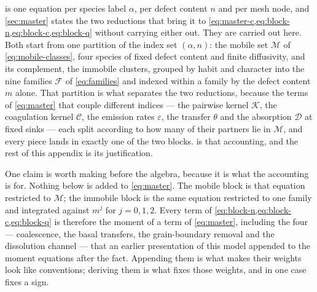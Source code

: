 is one equation per species label $\alpha$, per defect content
$n$ and per mesh node, and \cref{sec:master} states the two reductions that
bring it to \cref{eq:master-c,eq:block-n,eq:block-c,eq:block-q} without
carrying either out. They are carried out here. Both start from one partition of
the index set $(\alpha,n)$: the mobile set $\mathcal M$ of
\cref{eq:mobile-classes}, four species of fixed defect content and finite
diffusivity, and its complement, the immobile clusters, grouped by habit and
character into the nine families $\mathcal F$ of \cref{eq:families} and indexed
within a family by the defect content $m$ alone. That partition is what
separates the two reductions, because the terms of \cref{eq:master} that couple
different indices --- the pairwise kernel $\mathcal K$, the coagulation kernel
$\mathcal C$, the emission rates $\varepsilon$, the transfer $\theta$ and the
absorption $\mathcal D$ at fixed sinks --- each split according to how many of
their partners lie in $\mathcal M$, and every piece lands in exactly one of the
two blocks.  is that accounting, and the rest of this appendix
is its justification.

One claim is worth making before the algebra, because it is what the accounting
is for. Nothing below is added to \cref{eq:master}. The mobile block is that
equation restricted to $\mathcal M$; the immobile block is the same equation
restricted to one family and integrated against $m^{j}$ for $j=0,1,2$. Every
term of \cref{eq:block-n,eq:block-c,eq:block-q} is therefore the moment of a
term of \cref{eq:master}, including the four --- coalescence, the basal
transfers, the grain-boundary removal and the dissolution channel --- that an
earlier presentation of this model appended to the moment equations after the
fact. Appending them is what makes their weights look like conventions; deriving
them is what fixes those weights, and in one case fixes a sign.

